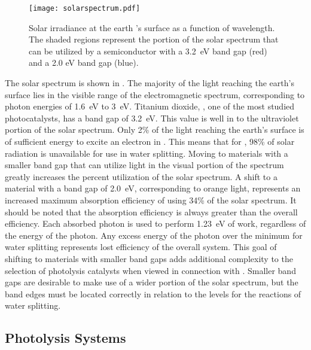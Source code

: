 \begin{figure}
	\centering
	\texttt{[image: solarspectrum.pdf]}
	\caption[Solar irradiance at the earth 's surface]{%
		Solar irradiance at the earth 's surface as a function of 
		wavelength. The shaded regions represent the portion of the 
		solar spectrum that can be utilized by a semiconductor with a 
		3.2~eV band gap (red) and a 2.0 eV band gap 
		(blue).\cite{Anonymous:jk}}
	\label{fig:solarspectrum}
\end{figure}

The solar spectrum is shown in . The majority of 
the light reaching the earth's surface lies in the visible range of the 
electromagnetic spectrum, corresponding to photon energies of 1.6~eV to 
3~eV. Titanium dioxide, , one of the most studied photocatalysts, 
has a band gap of 3.2~eV. This value is well in to the ultraviolet portion 
of the solar spectrum. Only 2\% of the light reaching the earth's surface 
is of sufficient energy to excite an electron in . This means that 
for , 98\% of solar radiation is unavailable for use in water 
splitting. Moving to materials with a smaller band gap that can utilize 
light in the visual portion of the spectrum greatly increases the percent 
utilization of the solar spectrum. A shift to a material with a band gap of 
2.0~eV, corresponding to orange light, represents an increased maximum 
absorption efficiency of using 34\% of the solar spectrum. It should be 
noted that the absorption efficiency is always greater than the overall 
efficiency. Each absorbed photon is used to perform 1.23~eV of work, 
regardless of the energy of the photon. Any excess energy of the photon 
over the minimum for water splitting represents lost efficiency of the 
overall system. This goal of shifting to materials with smaller band gaps 
adds additional complexity to the selection of photolysis catalysts when 
viewed in connection with . Smaller band gaps are 
desirable to make use of a wider portion of the solar spectrum, but the 
band edges must be located correctly in relation to the levels for the 
reactions of water splitting.


\subsection{Photolysis Systems}
\label{subsec:background.systems}


